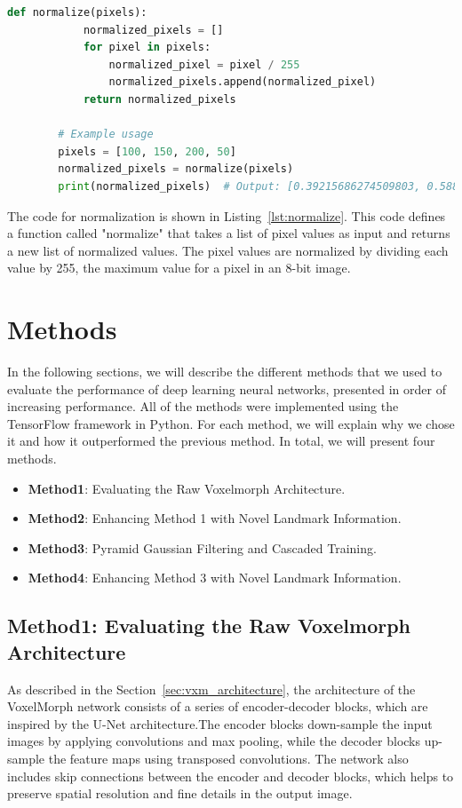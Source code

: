 \documentclass{report}
\begin{document}
	\begin{lstlisting}[language=python, label=lst:normalize]
		def normalize(pixels):
			normalized_pixels = []
			for pixel in pixels:
				normalized_pixel = pixel / 255
				normalized_pixels.append(normalized_pixel)
			return normalized_pixels
	
		# Example usage
		pixels = [100, 150, 200, 50]
		normalized_pixels = normalize(pixels)
		print(normalized_pixels)  # Output: [0.39215686274509803, 0.5882352941176471, 0.7843137254901961, 0.19607843137254902]
	\end{lstlisting}
	
	The code for normalization is shown in Listing~\ref{lst:normalize}. This code defines a function called "normalize" that takes a list of pixel values as input and returns a new list of normalized values. The pixel values are normalized by dividing each value by 255, the maximum value for a pixel in an 8-bit image.
	
	\section{Methods}
	
	In the following sections, we will describe the different methods that we used to evaluate the performance of deep learning neural networks, presented in order of increasing performance. All of the methods were implemented using the TensorFlow framework in Python. For each method, we will explain why we chose it and how it outperformed the previous method. In total, we will present four methods.
	\begin{itemize}
		\item \textbf{Method1}: Evaluating the Raw Voxelmorph Architecture.
		\item \textbf{Method2}: Enhancing Method 1 with Novel Landmark Information.
		\item \textbf{Method3}: Pyramid Gaussian Filtering and Cascaded Training.
		\item \textbf{Method4}: Enhancing Method 3 with Novel Landmark Information.
	\end{itemize}

	\subsection{Method1: Evaluating the Raw Voxelmorph Architecture}
	
	As described in the Section~\ref{sec:vxm_architecture}, the architecture of the VoxelMorph network consists of a series of encoder-decoder blocks, which are inspired by the U-Net architecture.The encoder blocks down-sample the input images by applying convolutions and max pooling, while the decoder blocks up-sample the feature maps using transposed convolutions. The network also includes skip connections between the encoder and decoder blocks, which helps to preserve spatial resolution and fine details in the output image.
	
\end{document}
